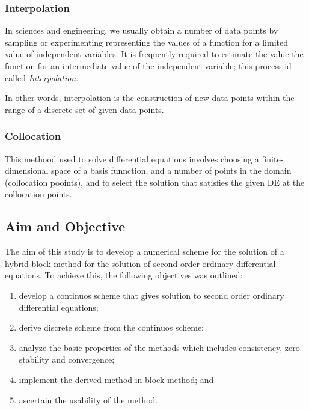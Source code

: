 \documentclass[12pt]{article}
\begin{document}
	\subsubsection{Interpolation}
	In sciences and engineering, we usually obtain a number of data points by sampling or experimenting representing the values of a function for a limited value of independent variables. It is frequently required to estimate the value the function for an intermediate value of the independent variable; this process id called \textsl{Interpolation}. 
	
	In other words, interpolation is the construction of new data points within the range of a discrete set of given data points.
	\subsubsection{Collocation}
	This methood used to solve differential equations involves choosing a finite-dimensional space of a basis funnction, and a number of points in the domain (collocation pooints), and to select the solution that satisfies the given DE at the collocation points.

\subsection{Aim and Objective}
	The aim of this study is to develop a numerical scheme for the solution of a hybrid block method for the solution of second order ordinary differential equations. To achieve this, the following objectives was outlined:
	\begin{enumerate}
		\item develop a continuos scheme that gives solution to second order ordinary differential equations;
		\item  derive discrete scheme from the continuos scheme;
		\item analyze the basic properties of the methods which includes consistency, zero stability and convergence;
		\item  implement the derived method in block method; and
		\item  ascertain the usability of the method.
	\end{enumerate}

\bigskip

\bigskip

\bigskip
\bigskip
\end{document}
